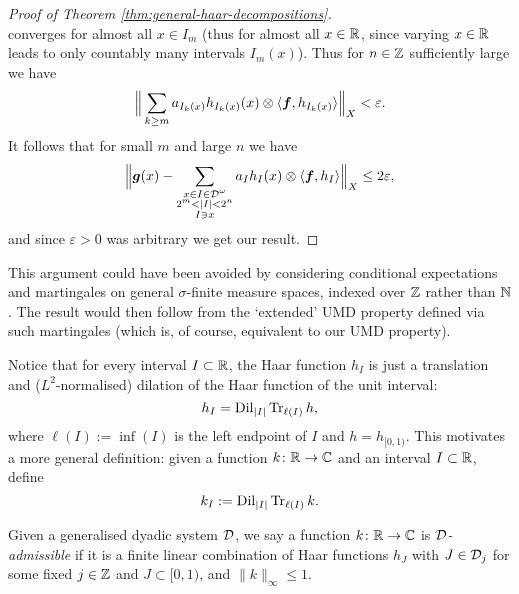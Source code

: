\begin{proof}[Proof of Theorem \ref{thm:general-haar-decompositions}]
\begin{equation*}
\end{equation*}
converges for almost all $x \in I_{m}$ (thus for almost all $x \in \mathbb{R}$, since varying $x \in \mathbb{R}$ leads to only countably many intervals $I_{m}(x)$).
Thus for $n \in \mathbb{Z}$ sufficiently large we have
\begin{equation*}
  \Big\| \sum_{k \geq m} a_{I_{k}(x)} h_{I_{k}(x)}(x) \otimes \langle \bm{f}, h_{I_{k}(x)} \rangle \Big\|_{X} < \varepsilon.
\end{equation*}
It follows that for small $m$ and large $n$ we have
\begin{equation*}
  \Big\|  \bm{g}(x) - \sum_{\substack{x \in I \in \mathcal{D}^{\omega} \\ 2^{m} < |I| < 2^{n} \\ I \ni x}} a_{I} h_{I}(x) \otimes \langle \bm{f}, h_{I} \rangle  \Big\|_{X} \leq 2\varepsilon,
\end{equation*}
and since $\varepsilon > 0$ was arbitrary we get our result.
\end{proof}

\begin{rmk}
  This argument could have been avoided by considering conditional expectations and martingales on general $\sigma$-finite measure spaces, indexed over $\mathbb{Z}$ rather than $\mathbb{N}$.
  The result would then follow from the `extended' UMD property defined via such martingales (which is, of course, equivalent to our UMD property).
\end{rmk}


Notice that for every interval $I \subset \mathbb{R}$, the Haar function $h_{I}$ is just a translation and ($L^2$-normalised) dilation of the Haar function of the unit interval:%
\begin{equation*}
  h_{I} = \operatorname{Dil}_{|I|} \operatorname{Tr}_{\ell(I)} h,
\end{equation*}
where $\ell(I) := \inf(I)$ is the left endpoint of $I$ and $h = h_{[0,1)}$.
This motivates a more general definition: given a function $k \colon \mathbb{R} \rightarrow \mathbb{C}$ and an interval $I \subset \mathbb{R}$, define
\begin{equation*}
  k_{I} := \operatorname{Dil}_{|I|} \operatorname{Tr}_{\ell(I)} k.
\end{equation*}

\begin{defn}
  Given a generalised dyadic system $\mathcal{D}$, we say a function $k \colon \mathbb{R} \rightarrow \mathbb{C}$ is \emph{$\mathcal{D}$-admissible} if it is a finite linear combination of Haar functions $h_{J}$ with $J \in \mathcal{D}_{j}$ for some fixed $j \in \mathbb{Z}$ and $J \subset [0,1)$,
  and $\|k\|_{\infty} \leq 1$.
\end{defn}

